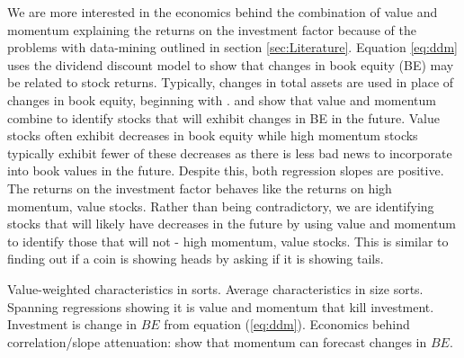 We are more interested in the economics behind the combination of value and momentum
explaining the returns on the investment factor because of the problems with data-mining
outlined in section \ref{sec:Literature}. Equation \ref{eq:ddm} uses the dividend discount
model to show that changes in book equity (BE) may be related to stock returns. Typically,
changes in total assets are used in place of changes in book equity, beginning with
\parencite{fama2006profitability}. \textcite{kok2017facts} and \textcite{asness2013devil}
show that value and momentum combine to identify stocks that will exhibit changes in BE in
the future. Value stocks often exhibit decreases in book equity while high momentum stocks
typically exhibit fewer of these decreases as there is less bad news to incorporate into
book values in the future. Despite this, both regression slopes are positive. The returns
on the investment factor behaves like the returns on high momentum, value stocks. Rather
than being contradictory, we are identifying stocks that will likely have decreases in the
future by using value and momentum to identify those that will not - high momentum, value
stocks. This is similar to finding out if a coin is showing heads by asking if it is
showing tails.



Value-weighted characteristics in sorts. Average characteristics in size sorts. Spanning
regressions showing it is value and momentum that kill investment. Investment is change in
$BE$ from equation (\ref{eq:ddm}). Economics behind correlation/slope attenuation:
\textcite{asness2013devil} show that momentum  can forecast changes in $BE$.
